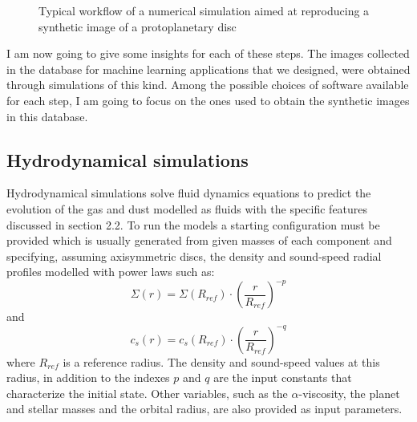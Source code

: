 \documentclass[a4paper,10pt]{report}
\begin{document}
\begin{figure}
\begin{center}
\begin{tikzpicture}

            \end{tikzpicture}
    \end{center}
    \caption{Typical workflow of a numerical simulation
     aimed at reproducing a synthetic image of a protoplanetary disc}
\end{figure}

I am now going to give some insights for each of these steps. The images collected in the database for machine learning
applications that we designed, were obtained through simulations of this kind. Among the possible choices
of software available for each step, I am going to focus on the ones used to obtain the synthetic images
in this database.

\subsection{Hydrodynamical simulations}

Hydrodynamical simulations solve fluid dynamics equations to predict the evolution of the gas and dust 
modelled as fluids with the specific features discussed in section 2.2.
To run the models a starting configuration must be provided which is usually generated from given masses 
of each component and specifying, assuming axisymmetric discs, the density and sound-speed radial profiles modelled
with power laws such as:
\begin{equation}
    \Sigma(r) = \Sigma(R_{ref})\cdot\left(\frac{r}{R_{ref}}\right)^{-p}
\end{equation}
and
\begin{equation}
    c_s(r) = c_s(R_{ref})\cdot\left(\frac{r}{R_{ref}}\right)^{-q}
\end{equation}
where $R_{ref}$ is a reference radius. The density and sound-speed values at this radius, in addition to the indexes $p$ and $q$
are the input constants that characterize the initial state.
Other variables, such as the $\alpha$-viscosity, the planet and stellar masses and the orbital radius, are also provided as input parameters.
\end{document}
